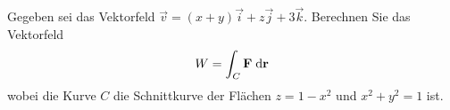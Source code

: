\begin{atiTask}[
  title = Wegintegrale berechnen
]
Gegeben sei das Vektorfeld $\vec{v}=(x+y)\vec{i}+z\vec{j}+3\vec{k}$. Berechnen Sie das Vektorfeld
\begin{equation*}
W=\int_C \mathbf{F} \;\mathrm{d}\mathbf{r}
\end{equation*}
wobei die Kurve $C$ die Schnittkurve der Flächen $z=1-x^2$ und $x^2+y^2=1$ ist. \end{atiTask}
